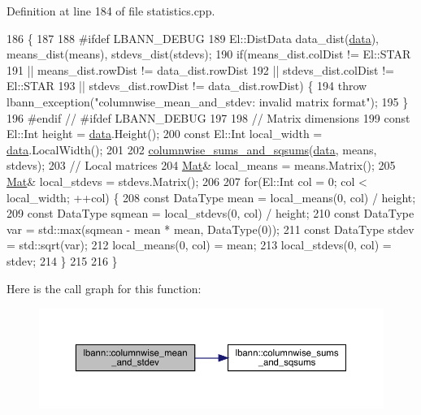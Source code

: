 Definition at line 184 of file statistics.\+cpp.


\begin{DoxyCode}
186                                                    \{
187 
188 \textcolor{preprocessor}{#ifdef LBANN\_DEBUG}
189   El::DistData data\_dist(\hyperlink{namespacelbann_1_1cnpy__utils_a9ac86d96ccb1f8b4b2ea16441738781f}{data}), means\_dist(means), stdevs\_dist(stdevs);
190   \textcolor{keywordflow}{if}(means\_dist.colDist != El::STAR
191       || means\_dist.rowDist != data\_dist.rowDist
192       || stdevs\_dist.colDist != El::STAR
193       || stdevs\_dist.rowDist != data\_dist.rowDist) \{
194     \textcolor{keywordflow}{throw} lbann\_exception(\textcolor{stringliteral}{"columnwise\_mean\_and\_stdev: invalid matrix format"});
195   \}
196 \textcolor{preprocessor}{#endif // #ifdef LBANN\_DEBUG}
197 
198   \textcolor{comment}{// Matrix dimensions}
199   \textcolor{keyword}{const} El::Int height = \hyperlink{namespacelbann_1_1cnpy__utils_a9ac86d96ccb1f8b4b2ea16441738781f}{data}.Height();
200   \textcolor{keyword}{const} El::Int local\_width = \hyperlink{namespacelbann_1_1cnpy__utils_a9ac86d96ccb1f8b4b2ea16441738781f}{data}.LocalWidth();
201 
202   \hyperlink{namespacelbann_ab043d2f2f9dea0ee861aff3a38216b24}{columnwise\_sums\_and\_sqsums}(\hyperlink{namespacelbann_1_1cnpy__utils_a9ac86d96ccb1f8b4b2ea16441738781f}{data}, means, stdevs);
203   \textcolor{comment}{// Local matrices}
204   \hyperlink{base_8hpp_a68f11fdc31b62516cb310831bbe54d73}{Mat}& local\_means = means.Matrix();
205   \hyperlink{base_8hpp_a68f11fdc31b62516cb310831bbe54d73}{Mat}& local\_stdevs = stdevs.Matrix();
206 
207   \textcolor{keywordflow}{for}(El::Int col = 0; col < local\_width; ++col) \{
208     \textcolor{keyword}{const} DataType mean = local\_means(0, col) / height;
209     \textcolor{keyword}{const} DataType sqmean = local\_stdevs(0, col) / height;
210     \textcolor{keyword}{const} DataType var = std::max(sqmean - mean * mean, DataType(0));
211     \textcolor{keyword}{const} DataType stdev = std::sqrt(var);
212     local\_means(0, col) = mean;
213     local\_stdevs(0, col) = stdev;
214   \}
215 
216 \}
\end{DoxyCode}
Here is the call graph for this function\+:\nopagebreak
\begin{figure}[H]
\begin{center}
\leavevmode
\includegraphics[width=350pt]{namespacelbann_a085b697db535c10a6fd6689cc4445bd4_cgraph}
\end{center}
\end{figure}
\mbox{\label{namespacelbann_ab043d2f2f9dea0ee861aff3a38216b24}} 
